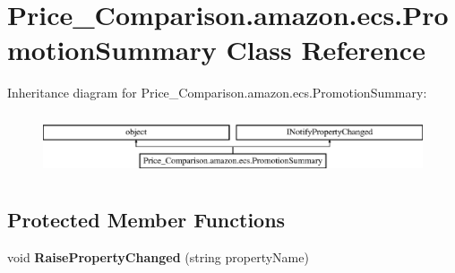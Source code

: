 \hypertarget{class_price___comparison_1_1amazon_1_1ecs_1_1_promotion_summary}{\section{Price\-\_\-\-Comparison.\-amazon.\-ecs.\-Promotion\-Summary Class Reference}
\label{class_price___comparison_1_1amazon_1_1ecs_1_1_promotion_summary}
}


 


Inheritance diagram for Price\-\_\-\-Comparison.\-amazon.\-ecs.\-Promotion\-Summary\-:\begin{figure}[H]
\begin{center}
\leavevmode
\includegraphics[height=1.824104cm]{class_price___comparison_1_1amazon_1_1ecs_1_1_promotion_summary}
\end{center}
\end{figure}
\subsection*{Protected Member Functions}
\begin{DoxyCompactItemize}
\item 
\hypertarget{class_price___comparison_1_1amazon_1_1ecs_1_1_promotion_summary_a35bca07f92862ddf9d1f1859b633c8b0}{void {\bfseries Raise\-Property\-Changed} (string property\-Name)}\label{class_price___comparison_1_1amazon_1_1ecs_1_1_promotion_summary_a35bca07f92862ddf9d1f1859b633c8b0}

\end{DoxyCompactItemize}
